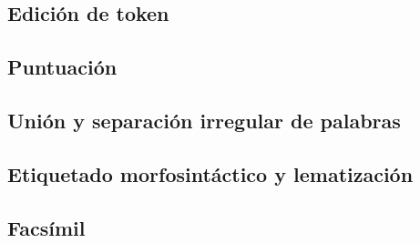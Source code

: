 \documentclass[
]{book}
\begin{document}
\hypertarget{ediciuxf3n-de-token-1}{%
\subsection*{Edición de token}\label{ediciuxf3n-de-token-1}}

\hypertarget{puntuaciuxf3n-1}{%
\subsection*{Puntuación}\label{puntuaciuxf3n-1}}

\hypertarget{uniuxf3n-y-separaciuxf3n-irregular-de-palabras-1}{%
\subsection*{Unión y separación irregular de palabras}\label{uniuxf3n-y-separaciuxf3n-irregular-de-palabras-1}}

\hypertarget{etiquetado-morfosintuxe1ctico-y-lematizaciuxf3n-1}{%
\subsection*{Etiquetado morfosintáctico y lematización}\label{etiquetado-morfosintuxe1ctico-y-lematizaciuxf3n-1}}

\hypertarget{facsuxedmil-1}{%
\subsection*{Facsímil}\label{facsuxedmil-1}}

  
\end{document}
